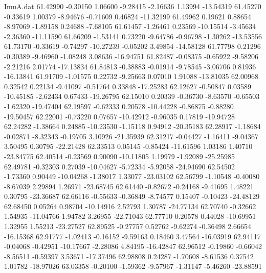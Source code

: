 \begin{filecontents}{ImuA.dat}
  61.42990   -0.30150    1.06600   -9.28415   -2.16636    1.13994  -13.54319
  61.45270   -0.33619    1.00379   -8.94676   -0.71609    0.46824  -11.32199
  61.49962    0.19621    0.88654   -8.97069   -1.89158    0.24688   -7.68105
  61.61457   -1.26461    0.23569  -10.15514   -3.45634   -2.36360  -11.11590
  61.66209   -1.53141    0.73220   -9.64786   -0.96798   -1.30262  -13.53556
  61.73170   -0.33619   -0.74297  -10.27239   -0.05202    3.49854  -14.58128
  61.77798    0.21296   -0.30389   -9.46960   -1.08248    3.08636  -16.94751
  61.82487   -0.08375   -0.65922   -9.58206   -2.21216    2.01774  -17.13834
  61.84813   -0.38883   -0.01914   -9.78545   -3.06706    0.81936  -16.13841
  61.91709   -1.01575    0.22732   -9.25663    0.07010    1.91088  -13.81035
  62.00968    0.32542    0.22134   -9.41097   -0.51764    0.33848  -17.25283
  62.12627   -0.50847    0.03589  -10.45185   -2.62434    0.67433  -19.26795
  62.15010    0.20339   -0.36730   -8.63570   -0.65503   -1.62320  -19.47404
  62.19597   -0.62333    0.20578  -10.44228   -0.86875   -0.88280  -19.50457
  62.22001   -0.73220    0.07657  -10.42912   -0.96035    0.17819  -19.94728
  62.24282   -1.38664    0.24885  -10.23530   -1.15118    0.94912  -20.35183
  62.28917   -1.18684   -0.02871   -8.32343   -0.19705    3.10926  -21.35939
  62.31217   -0.04427   -1.16411   -9.04367    3.50495    0.30795  -22.21428
  62.33513    0.05145   -0.85424  -11.61596    1.03186    1.40710  -23.84775
  62.40514   -0.23569    0.90090  -10.11805    1.19979   -1.92089  -25.25985
  62.49781   -0.32303    0.27039  -10.04627   -5.72334   -5.92058  -24.94690
  62.54502   -1.73360    0.90449  -10.04268   -1.38017    1.33077  -23.03102
  62.56799   -1.10548   -0.40080   -8.67039    2.29894    1.26971  -23.68745
  62.61440   -0.82672   -0.24168   -9.41695    1.48221    0.30795  -23.36687
  62.66116   -0.55633   -0.36849   -8.74577    0.15407   -0.10423  -24.48129
  62.68450    0.05264    0.98704  -10.14916    2.52793    1.30787  -24.77134
  62.70740   -0.32662    1.54935  -11.04766    1.94782    3.26955  -22.71043
  62.77710    0.20578    0.44028  -10.69951    1.32955    1.55213  -23.27527
  62.89525   -0.27757    0.52762   -9.62274   -0.36498    2.66654  -16.15368
  62.91777   -1.02413   -0.16152   -9.59163    0.18460    3.47564  -16.03919
  62.94117   -0.04068   -0.42951  -10.17667   -2.28086    4.84195  -16.42847
  62.96512   -0.19860   -0.66042   -8.56511   -0.59397    3.53671  -17.37496
  62.98808    0.24287   -1.70608   -8.61536    0.37542    1.01782  -18.97026
  63.03358   -0.20100   -1.59362   -9.57967   -1.31147   -5.46260  -23.88591

\end{filecontents}
